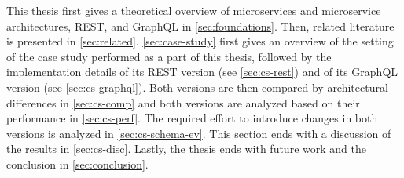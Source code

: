 
This thesis first gives a theoretical overview of microservices and microservice architectures, \ac{REST}, and GraphQL in \autoref{sec:foundations}.
Then, related literature is presented in \autoref{sec:related}.
\autoref{sec:case-study} first gives an overview of the setting of the case study performed as a part of this thesis, followed by the implementation details of its \ac{REST} version (see \autoref{sec:cs-rest}) and of its GraphQL version (see \autoref{sec:cs-graphql}).
Both versions are then compared by architectural differences in \autoref{sec:cs-comp} and both versions are analyzed based on their performance in \autoref{sec:cs-perf}.
The required effort to introduce changes in both versions is analyzed in \autoref{sec:cs-schema-ev}.
This section ends with a discussion of the results in \autoref{sec:cs-disc}.
Lastly, the thesis ends with future work and the conclusion in \autoref{sec:conclusion}.
